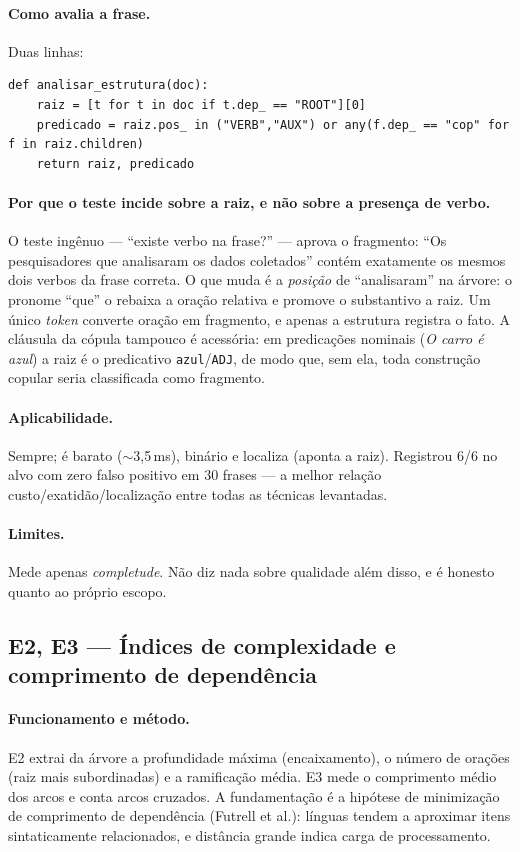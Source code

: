 \documentclass[11pt,a4paper]{article}
\begin{document}
\paragraph{Como avalia a frase.} Duas linhas:

\begin{lstlisting}
def analisar_estrutura(doc):
    raiz = [t for t in doc if t.dep_ == "ROOT"][0]
    predicado = raiz.pos_ in ("VERB","AUX") or any(f.dep_ == "cop" for f in raiz.children)
    return raiz, predicado
\end{lstlisting}

\paragraph{Por que o teste incide sobre a raiz, e não sobre a presença de verbo.} O teste ingênuo
--- ``existe verbo na frase?'' --- aprova o fragmento: ``Os pesquisadores que analisaram os dados
coletados'' contém exatamente os mesmos dois verbos da frase correta. O que muda é a \emph{posição}
de ``analisaram'' na árvore: o pronome ``que'' o rebaixa a oração relativa e promove o substantivo a
raiz. Um único \textit{token} converte oração em fragmento, e apenas a estrutura registra o fato. A
cláusula da cópula tampouco é acessória: em predicações nominais (\emph{O carro é azul}) a raiz é o
predicativo \texttt{azul}/\texttt{ADJ}, de modo que, sem ela, toda construção copular seria
classificada como fragmento.

\paragraph{Aplicabilidade.} Sempre; é barato ($\sim$3,5\,ms), binário e localiza (aponta a raiz).
Registrou 6/6 no alvo com zero falso positivo em 30 frases --- a melhor relação
custo/exatidão/localização entre todas as técnicas levantadas.

\paragraph{Limites.} Mede apenas \emph{completude}. Não diz nada sobre qualidade além disso, e é
honesto quanto ao próprio escopo.

\subsection{E2, E3 --- Índices de complexidade e comprimento de dependência}

\paragraph{Funcionamento e método.} E2 extrai da árvore a profundidade máxima (encaixamento), o
número de orações (raiz mais subordinadas) e a ramificação média. E3 mede o comprimento médio dos
arcos e conta arcos cruzados. A fundamentação é a hipótese de minimização de comprimento de
dependência (Futrell et al.): línguas tendem a aproximar itens sintaticamente relacionados, e
distância grande indica carga de processamento.
\end{document}
